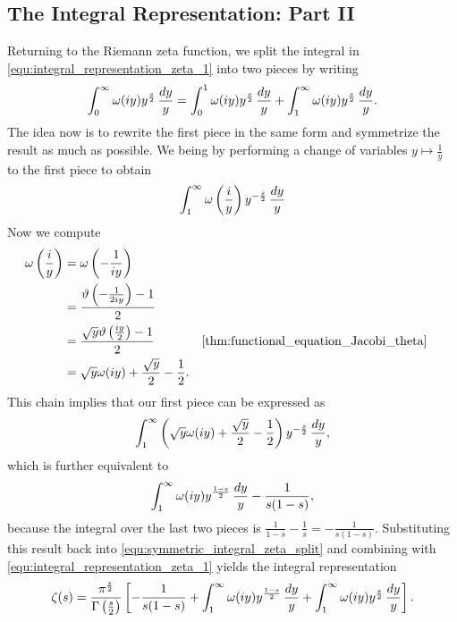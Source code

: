     \subsection*{The Integral Representation: Part II}
      Returning to the Riemann zeta function, we split the integral in \cref{equ:integral_representation_zeta_1} into two pieces by writing
      \begin{equation}\label{equ:symmetric_integral_zeta_split}
        \int_{0}^{\infty}\omega(iy)y^{\frac{s}{2}}\,\frac{dy}{y} = \int_{0}^{1}\omega(iy)y^{\frac{s}{2}}\,\frac{dy}{y}+\int_{1}^{\infty}\omega(iy)y^{\frac{s}{2}}\,\frac{dy}{y}.
      \end{equation}
      The idea now is to rewrite the first piece in the same form and symmetrize the result as much as possible. We being by performing a change of variables $y \mapsto \frac{1}{y}$ to the first piece to obtain
      \[
        \int_{1}^{\infty}\omega\left(\frac{i}{y}\right)y^{-\frac{s}{2}}\,\frac{dy}{y}
      \]
      Now we compute
      \begin{align*}
        \w\left(\frac{i}{y}\right) &= \w\left(-\frac{1}{iy}\right) \\
        &= \frac{\vt\left(-\frac{1}{2iy}\right)-1}{2} \\
        &= \frac{\sqrt{y}\vt\left(\frac{iy}{2}\right)-1}{2} && \text{\cref{thm:functional_equation_Jacobi_theta}} \\
        &= \sqrt{y}\w(iy)+\frac{\sqrt{y}}{2}-\frac{1}{2}.
      \end{align*}
      This chain implies that our first piece can be expressed as
      \[
        \int_{1}^{\infty}\left(\sqrt{y}\omega(iy)+\frac{\sqrt{y}}{2}-\frac{1}{2}\right)y^{-\frac{s}{2}}\,\frac{dy}{y},
      \]
      which is further equivalent to
      \[
        \int_{1}^{\infty}\omega(iy)y^{\frac{1-s}{2}}\,\frac{dy}{y}-\frac{1}{s(1-s)},
      \]
      because the integral over the last two pieces is $\frac{1}{1-s}-\frac{1}{s} = -\frac{1}{s(1-s)}$. Substituting this result back into \cref{equ:symmetric_integral_zeta_split} and combining with \cref{equ:integral_representation_zeta_1} yields the integral representation
      \begin{equation}\label{equ:integral_representation_zeta_final}
        \zeta(s) = \frac{\pi^{\frac{s}{2}}}{\Gamma\left(\frac{s}{2}\right)}\left[-\frac{1}{s(1-s)}+\int_{1}^{\infty}\omega(iy)y^{\frac{1-s}{2}}\,\frac{dy}{y}+\int_{1}^{\infty}\omega(iy)y^{\frac{s}{2}}\,\frac{dy}{y}\right].
      \end{equation}
